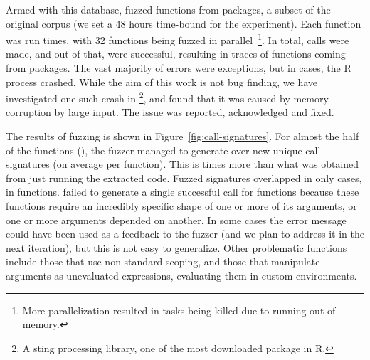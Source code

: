 \documentclass[sigplan,anonymous,review]{acmart}
\begin{document}
Armed with this database, \tool fuzzed \UFNumFunctions functions from \UFNumPackages packages, a subset of the original corpus (we set a 48 hours time-bound for the experiment).
Each function was run \UFTracingBudget times, with 32 functions being fuzzed in parallel~\footnote{More parallelization resulted in tasks being killed due to running out of memory.}.
In total, \UFNumTracesRnd calls were made, and out of that, \UFRatioSuccessTraces were successful, resulting in \UFNumSuccessTraces traces of \UFNumSuccessFunctions functions coming from \UFNumSuccessPackages packages.
The vast majority of errors were exceptions, but in \UFNumOfCrashedRSessions cases, the R process crashed.
While the aim of this work is not bug finding, we have investigated one such crash in \footnote{A sting processing library, one of the most downloaded package in R.}, and found that it was caused by memory corruption by large input.
The issue was reported, acknowledged and fixed.

The results of fuzzing is shown in Figure~\ref{fig:call-signatures}.
For almost the half of the functions (\UFNumFunctionSignatrSignatureRatio), the fuzzer managed to generate over \UFSignatrSignaturesRnd new unique call signatures (on average \UFAvgNewSignatrSignature per function).
This is \UFSignatrBaselineSignaturesRatio times more than what was obtained from just running the extracted code.
Fuzzed signatures overlapped in only \UFSharedSignature cases, in \UFSharedSignatureFunction functions.
\tool failed to generate a single successful call for \UFNumMissingFunctionSignatr functions because these functions require an incredibly specific shape of one or more of its arguments, or one or more arguments depended on another.
In some cases the error message could have been used as a feedback to the fuzzer (and we plan to address it in the next iteration), but this is not easy to generalize.
Other problematic functions include those that use non-standard scoping, and those that manipulate arguments as unevaluated expressions, evaluating them in custom environments.
\end{document}
